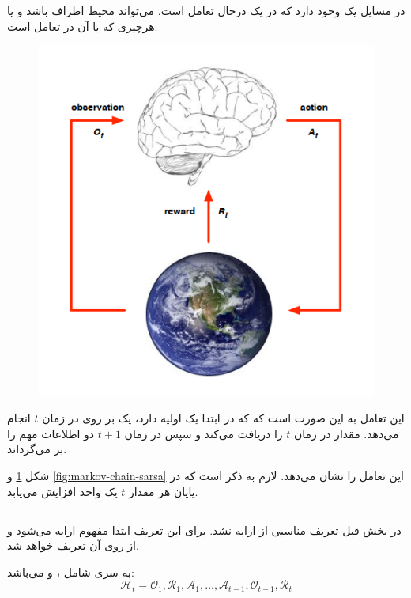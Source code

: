  در مسایل  یک 
 \textbf{}
 وحود دارد که در یک \textbf{} درحال تعامل است.  می‌تواند محیط اطراف  باشد و یا هرچیزی که  با آن در تعامل است.
  \cite{uclRL}
\begin{figure}[t]
	\centering
	\includegraphics[width=0.7\linewidth]{Figures/RL/Enviroment-brain-as-agent}
	\caption{}
	\label{fig:enviroment-brain-as-agent}
\end{figure}

این تعامل به این صورت است که  که در ابتدا یک  اولیه دارد، یک  بر روی  در زمان $t$ انجام می‌دهد. 
 مقدار  در زمان $t$ را دریافت می‌کند و 
سپس  در زمان $t+1$ دو اطلاعات مهم را بر می‌گرداند. 
\begin{alphinline}
	\item {}
	\item {}
\end{alphinline}

شکل 
\ref{fig:enviroment-brain-as-agent}
و \ref{fig:markov-chain-sarsa}
این تعامل را نشان می‌دهد. لازم به ذکر است که در پایان هر  مقدار $t$ یک واحد افزایش می‌یابد.

\subsection{}
در بخش قبل تعریف مناسبی از  ارایه نشد. برای این تعریف ابتدا مفهوم  ارایه می‌شود و از روی آن  تعریف خواهد شد.

\begin{definition}[\w{history}]
	به سری شامل ،  و  می‌باشد:
	\[
	\mathcal{H}_t = \mathcal{O}_1 ,\mathcal{R}_1, \mathcal{A}_1, \dots, \mathcal{A}_{t-1}, \mathcal{O}_{t-1}, \mathcal{R}_t
	\]
\end{definition}



